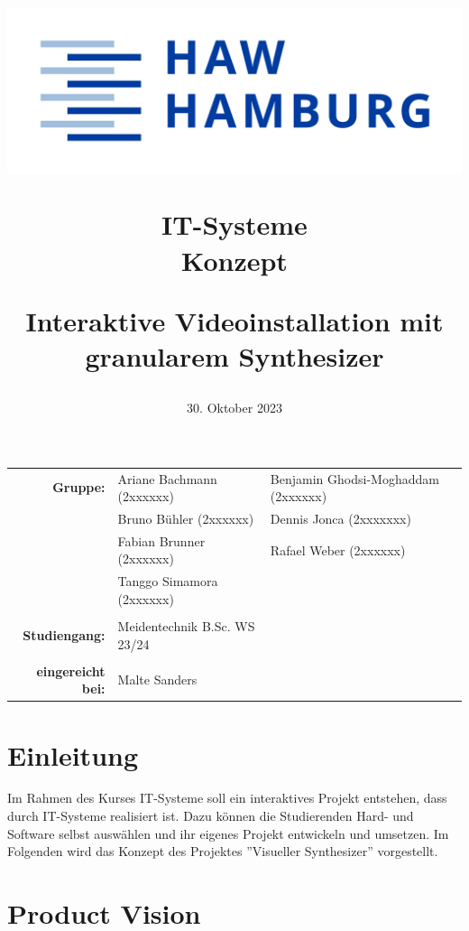 \documentclass[12pt]{scrartcl}%
\title{
\begin{flushright}
 \includegraphics[scale=0.5]{HAW_Marke_RGB_300dpi.jpg}
\end{flushright}

\vspace{3cm}

IT-Systeme\\
Konzept
 
\vspace{3cm}

\LARGE Interaktive Videoinstallation mit\\
granularem Synthesizer
}
\date{30.  Oktober 2023} %
\theoremstyle{nonumberplain}
\begin{document}
\begin{titlepage}


\maketitle %


\vfill 

\begin{flushleft}
\begin{tabular}{rlll}
\textbf{Gruppe:} & Ariane Bachmann (2xxxxxx) & Benjamin Ghodsi-Moghaddam (2xxxxxx) & \hspace{5cm} \\
 & Bruno Bühler (2xxxxxx) & Dennis Jonca (2xxxxxxx) & \hspace{5cm} \\
 & Fabian Brunner (2xxxxxx) & Rafael Weber (2xxxxxx) & \hspace{5cm} \\
& Tanggo Simamora (2xxxxxx) & & \hspace{5cm} \\\\
\textbf{Studiengang:} & Meidentechnik B.Sc. WS 23/24 & \hspace{5cm} \\\\
\textbf{eingereicht bei:} & Malte Sanders & \hspace{5cm} \\ 
\end{tabular}
\end{flushleft}



\end{titlepage}

\tableofcontents


\newpage

\section{Einleitung}

Im Rahmen des Kurses IT-Systeme soll ein interaktives Projekt entstehen, dass durch IT-Systeme realisiert ist. Dazu können die Studierenden Hard- und Software selbst auswählen und ihr eigenes Projekt entwickeln und umsetzen. Im Folgenden wird das Konzept des Projektes ''Visueller Synthesizer'' vorgestellt. 

\section{Product Vision}
\lipsum[2]
\end{document}
